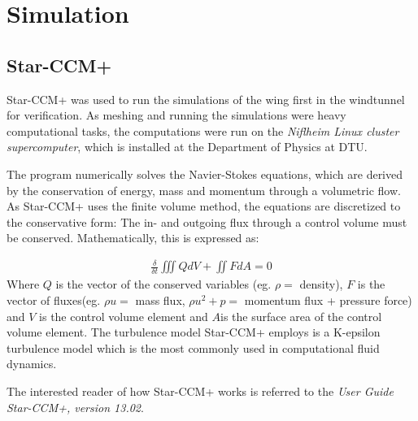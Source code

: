 \chapter{Simulation}
\label{chap:simulations}


\section{Star-CCM+}
  Star-CCM+ was used to run the simulations of the wing first in the windtunnel for verification. As meshing and running the simulations were heavy computational tasks, the computations were run on the \emph{Niflheim Linux cluster supercomputer}, which is installed at the Department of Physics at DTU.

  The program numerically solves the Navier-Stokes equations, which are derived by the conservation of energy, mass and momentum through a volumetric flow. As Star-CCM+ uses the finite volume method, the equations are discretized to the conservative form: The in- and outgoing flux through a control volume must be conserved. Mathematically, this is expressed as:

  \begin{align}
    \frac{\delta}{\delta t} \iiint Q dV + \iint F dA = 0
  \end{align}
  Where $Q$ is the vector of the conserved variables (eg. $\rho =$ density), $F$ is the vector of fluxes(eg. $\rho u =$ mass flux, $\rho u^2 + p=$ momentum flux + pressure force) and $V$ is the control volume element and $A$is the surface area of the control volume element. The turbulence model Star-CCM+ employs is a K-epsilon turbulence model which is the most commonly used in computational fluid dynamics. %

  The interested reader of how Star-CCM+ works is referred to the \emph{User Guide Star-CCM+, version 13.02}.

